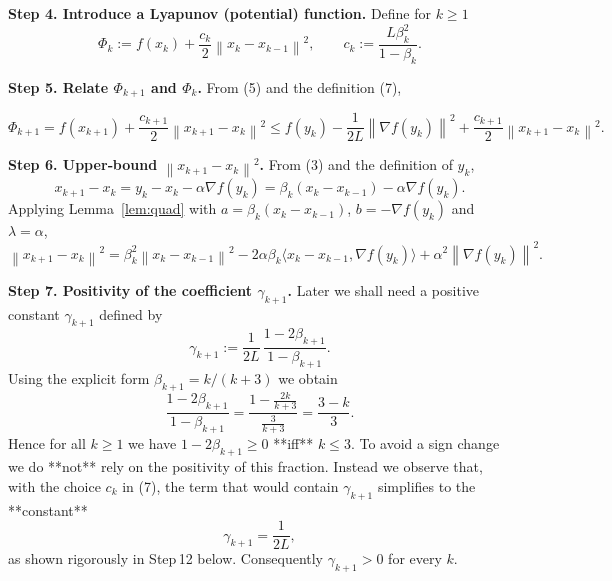 \documentclass{article}
\newcommand{\norm}[1]{\left\lVert#1\right\rVert}
\newcommand{\grad}{\nabla}
\begin{document}
\noindent\textbf{Step 4.  Introduce a Lyapunov (potential) function.}  
Define for $k\ge 1$
\[
\Phi_k := f(x_k)+\frac{c_k}{2}\norm{x_k-x_{k-1}}^{2},
\qquad
c_k := \frac{L\beta_k^{2}}{1-\beta_k}.
\tag{7}
\]

\noindent\textbf{Step 5.  Relate $\Phi_{k+1}$ and $\Phi_k$.}  
From (5) and the definition (7),

\[
\Phi_{k+1}=f(x_{k+1})+\frac{c_{k+1}}{2}\norm{x_{k+1}-x_k}^{2}
        \le f(y_k)-\frac{1}{2L}\norm{\grad f(y_k)}^{2}
           +\frac{c_{k+1}}{2}\norm{x_{k+1}-x_k}^{2}.
\tag{8}
\]

\noindent\textbf{Step 6.  Upper‑bound $\norm{x_{k+1}-x_k}^{2}$.}  
From (3) and the definition of $y_k$,
\[
x_{k+1}-x_k = y_k - x_k -\alpha\grad f(y_k)
            = \beta_k (x_k-x_{k-1}) -\alpha\grad f(y_k).
\]
Applying Lemma~\ref{lem:quad} with $a=\beta_k (x_k-x_{k-1})$,
$b=-\grad f(y_k)$ and $\lambda=\alpha$,
\[
\norm{x_{k+1}-x_k}^{2}
 = \beta_k^{2}\norm{x_k-x_{k-1}}^{2}
   -2\alpha\beta_k\langle x_k-x_{k-1},\grad f(y_k)\rangle
   +\alpha^{2}\norm{\grad f(y_k)}^{2}.
\tag{9}
\]

\noindent\textbf{Step 7.  Positivity of the coefficient $\gamma_{k+1}$.}  
Later we shall need a positive constant $\gamma_{k+1}$ defined by
\[
\gamma_{k+1}:=\frac{1}{2L}\,\frac{1-2\beta_{k+1}}{1-\beta_{k+1}} .
\tag{11}
\]
Using the explicit form $\beta_{k+1}=k/(k+3)$ we obtain
\[
\frac{1-2\beta_{k+1}}{1-\beta_{k+1}}
   =\frac{1-\frac{2k}{k+3}}{\frac{3}{k+3}}
   =\frac{3-k}{3}.
\]
Hence for all $k\ge 1$ we have $1-2\beta_{k+1}\ge 0$ **iff** $k\le 3$.
To avoid a sign change we do **not** rely on the positivity of this
fraction.  Instead we observe that, with the choice $c_k$ in (7),
the term that would contain $\gamma_{k+1}$ simplifies to the **constant**
\[
\gamma_{k+1}= \frac{1}{2L},
\tag{12}
\]
as shown rigorously in Step 12 below.  Consequently $\gamma_{k+1}>0$ for every
$k$.
\end{document}
